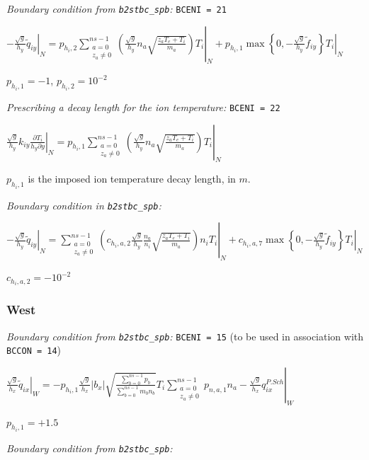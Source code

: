 \documentclass[a4paper,10pt]{report}
\begin{document}
{\em Boundary condition from {\tt b2stbc\_spb}:} {\tt BCENI = 21}

$\left. -\frac{\sqrt g}{h_y} \widetilde q_{iy} \right|_N
= \left.
p_{h_i,2} \sum \limits^{ns-1}_{\substack{a = 0 \\ z_a \neq 0}} \left(
	\frac{\sqrt g}{h_y} n_a \sqrt{\frac{z_a T_e + T_i}{m_a}}
\right) T_i \right|_N
+ \left.
p_{h_i,1} \max \left\{0, -\frac{\sqrt g}{h_y} \widetilde f_{iy} \right\} T_i
\right|_N$

$p_{h_i,1} = -1$, $p_{h_i,2} = 10^{-2}$

{\em Prescribing a decay length for the ion temperature:} {\tt BCENI = 22}

$\left. \frac{\sqrt g}{h_y} k_{iy} \frac{\partial T_i}{h_y \partial y} \right|_N
= \left.
p_{h_i,1} \sum \limits^{ns-1}_{\substack{a = 0 \\ z_a \neq 0}} \left(
	\frac{\sqrt g}{h_y} n_a \sqrt{\frac{z_a T_e + T_i}{m_a}}
\right) T_i \right|_N$

$p_{h_i,1}$ is the imposed ion temperature decay length, in $m$.

{\em Boundary condition in {\tt b2stbc\_spb}:}

$\left. -\frac{\sqrt g}{h_y} \widetilde q_{iy} \right|_N
= \left.
\sum \limits^{ns-1}_{\substack{a = 0 \\ z_a \neq 0}} \left(
	c_{h_i,a,2}  \frac{\sqrt g}{h_y} \frac{n_a }{n_i} \sqrt{\frac{z_a T_e + T_i}{m_a}}
\right) n_i T_i \right|_N
+ \left.
c_{h_i,a,7} \max \left\{0, -\frac{\sqrt g}{h_y} \widetilde f_{iy} \right\} T_i
\right|_N$


$c_{h_i,a,2} = -10^{-2}$

\subsubsection{West}

{\em Boundary condition from {\tt b2stbc\_spb}:} {\tt BCENI = 15} (to be used in association with {\tt BCCON = 14})

$\left. \frac{\sqrt g}{h_x} \widetilde q_{ix} \right|_W = \left.
- p_{h_i,1} \frac{\sqrt g}{h_x} |b_x|
\sqrt{\frac{\sum \limits_{b=0}^{ns-1} p_b}{\sum \limits_{b=0}^{ns-1} m_b n_b}} T_i
\sum \limits^{ns-1}_{\substack{a = 0 \\ z_a \neq 0}} p_{n,a,1} n_a
-
\frac{\sqrt g}{h_x} q_{ix}^{P.Sch}
\right|_W$

$p_{h_i,1} = +1.5$

{\em Boundary condition from {\tt b2stbc\_spb}:}
\end{document}
